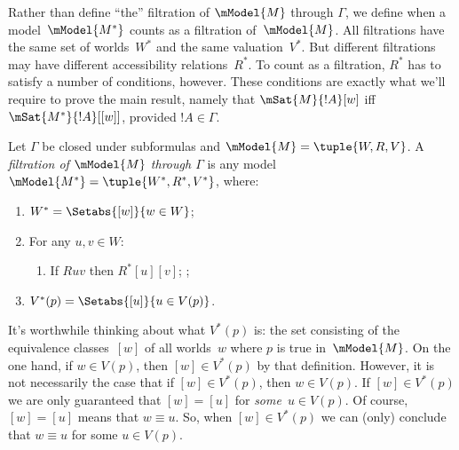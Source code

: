 \documentclass[../../../include/open-logic-section]{subfiles}
\begin{document}


Rather than define ``the'' filtration of $\mModel{M}$ through
$\Gamma$, we define when a model~$\mModel{M^*}$ counts as a filtration
of~$\mModel{M}$. All filtrations have the same set of worlds~$W^*$ and
the same valuation~$V^*$. But different filtrations may have different
accessibility relations~$R^*$. To count as a filtration, $R^*$ has to
satisfy a number of conditions, however. These conditions are exactly
what we'll require to prove the main result, namely that
$\mSat{M}{!A}[w]$ iff $\mSat{M^*}{!A}[{[w]}]$, provided $!A \in
\Gamma$.

\begin{defn}
  Let $\Gamma$ be closed under subformulas and $\mModel{M} = \tuple{W,
    R, V}$. A \emph{filtration of $\mModel{M}$ through $\Gamma$} is
  any model $\mModel{M^*} = \tuple{W^*,R^*,V^*}$, where:
  \begin{enumerate}
  \item $W^* = \Setabs{[w]}{w \in W}$;
  \item {}%
    For any $u,v \in W$:
    \begin{enumerate}
    \item {}%
      If $Ruv$ then $R^*[u][v]$;
    ;
    \end{enumerate}
  \item $V^*(p) = \Setabs{[u]}{u \in V(p)}$.
  \end{enumerate}
\end{defn}

It's worthwhile thinking about what $V^*(p)$ is: the set consisting of
the equivalence classes~$[w]$ of all worlds~$w$ where $p$ is true
in~$\mModel{M}$. On the one hand, if $w \in V(p)$, then $[w] \in
V^*(p)$ by that definition. However, it is not necessarily the case
that if $[w] \in V^*(p)$, then $w \in V(p)$. If $[w] \in V^*(p)$ we
are only guaranteed that $[w] = [u]$ for \emph{some}~$u \in V(p)$. Of
course, $[w] = [u]$ means that $w \equiv u$.  So, when $[w] \in
V^*(p)$ we can (only) conclude that $w \equiv u$ for some $u \in
V(p)$.
\end{document}
